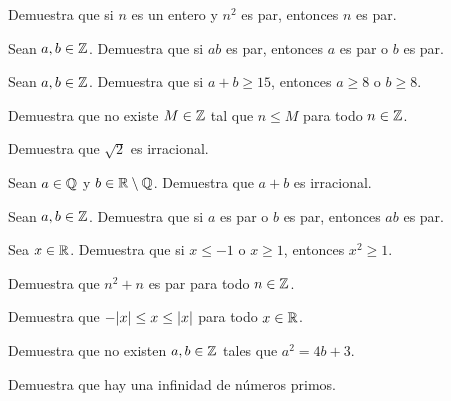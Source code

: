 \documentclass[12pt,a4paper]{article}
\begin{document}

    \begin{ejercicio}[1]
        Demuestra que si $n$ es un entero y $n^2$ es par, entonces $n$ es par.
    \end{ejercicio}

    \begin{ejercicio}[2]
        Sean $a,b\in\mathbb{Z}$. Demuestra que si $ab$ es par, entonces $a$ es par o $b$ es par.
    \end{ejercicio}

    \begin{ejercicio}[2]
        Sean $a,b\in\mathbb{Z}$. Demuestra que si $a+b\geq15$, entonces $a\geq8$ o $b\geq8$.
    \end{ejercicio}


    \begin{ejercicio}[2]
        Demuestra que no existe $M\in\mathbb{Z}$ tal que $n\leq M$ para todo $n\in\mathbb{Z}$.
    \end{ejercicio}

    \begin{ejercicio}[2]
        Demuestra que $\sqrt{2}$ es irracional.
    \end{ejercicio}

    \begin{ejercicio}[2]
        Sean $a\in\mathbb{Q}$ y $b\in\mathbb{R}\setminus\mathbb{Q}$. Demuestra que $a+b$ es irracional.
    \end{ejercicio}


    \begin{ejercicio}[1]
        Sean $a,b\in\mathbb{Z}$. Demuestra que si $a$ es par o $b$ es par, entonces $ab$ es par.
    \end{ejercicio}

    \begin{ejercicio}[1]
        Sea $x\in\mathbb{R}$. Demuestra que si $x\leq-1$ o $x\geq1$, entonces $x^2\geq1$.
    \end{ejercicio}

    \begin{ejercicio}[2]
        Demuestra que $n^2+n$ es par para todo $n\in\mathbb{Z}$.
    \end{ejercicio}

    \begin{ejercicio}[2]
        Demuestra que $-\abs{x}\leq x\leq\abs{x}$ para todo $x\in\mathbb{R}$.
    \end{ejercicio}


    \begin{ejercicio}[3]
        Demuestra que no existen $a,b\in\mathbb{Z}$ tales que $a^2=4b+3$.
    \end{ejercicio}

    \begin{ejercicio}[3]
        Demuestra que hay una infinidad de números primos.
    \end{ejercicio}

    \bitacora
\end{document}
